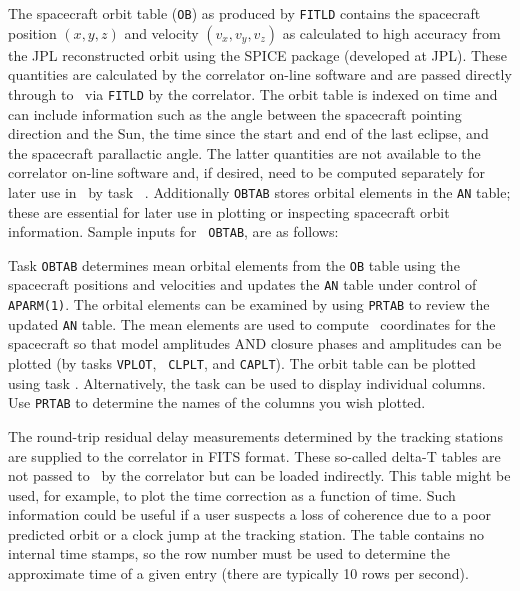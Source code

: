 
The spacecraft orbit table ({\tt OB}) as produced by {\tt FITLD}
contains the spacecraft position $(x,y,z)$ and velocity
$(v_x,v_y,v_z)$ as calculated to high accuracy from the JPL
reconstructed orbit using the SPICE package (developed at JPL).  These
quantities are calculated by the correlator on-line software and are
passed directly through to \AIPS\ via {\tt FITLD} by the 
correlator.  The orbit table is indexed on time and can include
information such as the angle between the spacecraft pointing
direction and the Sun, the time since the start and end of the last
eclipse, and the spacecraft parallactic angle. The latter quantities
are not available to the correlator on-line software and, if desired,
need to be computed separately for later use in \AIPS\ by task {\tt
{}}.  Additionally {\tt OBTAB} stores orbital elements in
the {\tt AN} table; these are essential for later use in plotting or
inspecting spacecraft orbit information.  Sample inputs for {\tt
OBTAB}, are as follows:

Task {\tt OBTAB} determines mean orbital elements from the {\tt OB}
table using the spacecraft positions and velocities and updates the
{\tt AN} table under control of {\tt APARM(1)}\@.  The orbital
elements can be examined by using {\tt PRTAB} to review the updated
{\tt AN} table.  The mean elements are used to compute \uv\
coordinates for the spacecraft so that model amplitudes AND closure
phases and amplitudes can be plotted (by tasks {\tt VPLOT}, {\tt
CLPLT}, and {\tt CAPLT})\@.  The orbit table can be plotted using task
{\tt \tndx{OBPLT}}\@.  Alternatively, the task {\tt \tndx{TAPLT}} can
be used to display individual columns.  Use {\tt PRTAB} to determine
the names of the columns you wish plotted.


The round-trip residual delay measurements determined by the tracking
stations are supplied to the correlator in FITS format. These
so-called delta-T tables are not passed to \AIPS\ by the correlator
but can be loaded indirectly.  This table might be used, for example,
to plot the time correction as a function of time.  Such information
could be useful if a user suspects a loss of coherence due to a poor
predicted orbit or a clock jump at the tracking station.  The table
contains no internal time stamps, so the row number must be used to
determine the approximate time of a given entry (there are typically
10 rows per second).


